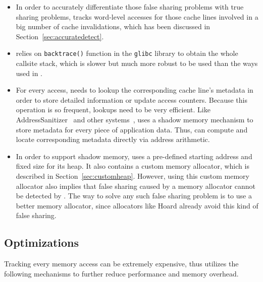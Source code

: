 \begin{itemize}
\item

In order to accurately differentiate those false sharing problems with true sharing problems, \Predator{} tracks word-level accesses for those cache lines involved in a big number of cache invalidations, which has been discussed in Section~\ref{sec:accuratedetect}.


\item
\predator{} relies on \texttt{backtrace()} function in the \texttt{glibc} library to obtain the whole callsite stack, which is slower but much more robust to be used than the ways used in \SheriffDetect{}.


\item
For every access, \Predator{} needs to lookup the corresponding cache line's metadata 
in order to store detailed information or update access counters. Because this operation is so frequent,
 lookups need to be very efficient.
Like AddressSanitizer~\cite{AddressSanitizer} and other systems~\cite{Valgrind, qinzhao},
\Predator{} uses a shadow memory mechanism to store metadata for every piece of application data. 
Thus, \Predator{} can compute and locate corresponding metadata directly via address arithmetic.

\item
In order to support shadow memory, \Predator{} uses a pre-defined starting address and fixed size for its heap.  It also contains a custom memory allocator, which is described in Section~\ref{sec:customheap}.  However, using this custom memory allocator also implies that false sharing caused by a memory allocator cannot be detected by \Predator{}. The way to solve any such false sharing problem is to use a better memory allocator, since allocators like Hoard already avoid this kind of false sharing.

\end{itemize} 
 
\subsection{Optimizations}
\label{optimization}
Tracking every memory access can be extremely expensive, thus \Predator{} utilizes the following mechanisms to further reduce performance and memory overhead.

